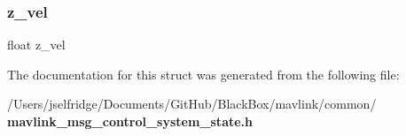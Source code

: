 \subsubsection{z\+\_\+vel}
{\footnotesize\ttfamily float z\+\_\+vel}



The documentation for this struct was generated from the following file\+:\begin{DoxyCompactItemize}
\item 
/\+Users/jselfridge/\+Documents/\+Git\+Hub/\+Black\+Box/mavlink/common/\textbf{ mavlink\+\_\+msg\+\_\+control\+\_\+system\+\_\+state.\+h}\end{DoxyCompactItemize}
